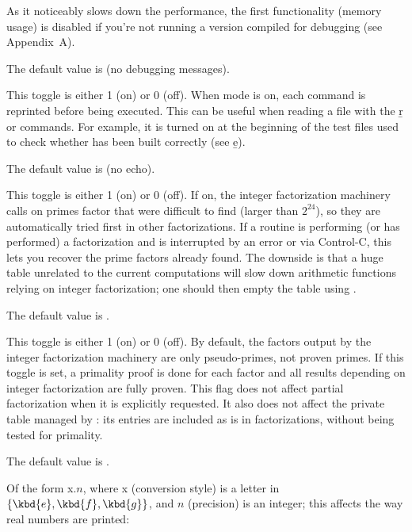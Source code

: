 As it noticeably slows down the performance,
the first functionality (memory usage) is disabled if you're not running a
version compiled for debugging (see Appendix~A).

The default value is  (no debugging messages).

\label{se:def,echo}
This toggle is either 1 (on) or 0 (off). When 
mode is on, each command is reprinted before being executed. This can be
useful when reading a file with the \b{r} or  commands. For
example, it is turned on at the beginning of the test files used to check
whether  has been built correctly (see \b{e}).

The default value is  (no echo).

\label{se:def,factor_add_primes}
This toggle is either 1 (on) or 0 (off). If on,
the integer factorization machinery calls  on primes
factor that were difficult to find (larger than $2^24$), so they are
automatically tried first in other factorizations. If a routine is performing
(or has performed) a factorization and is interrupted by an error or via
Control-C, this lets you recover the prime factors already found. The
downside is that a huge  table unrelated to the current
computations will slow down arithmetic functions relying on integer
factorization; one should then empty the table using .

The default value is .

\label{se:def,factor_proven}
This toggle is either 1 (on) or 0 (off). By
default, the factors output by the integer factorization machinery are
only pseudo-primes, not proven primes. If this toggle is
set, a primality proof is done for each factor and all results depending on
integer factorization are fully proven. This flag does not affect partial
factorization when it is explicitly requested. It also does not affect the
private table managed by : its entries are included as is in
factorizations, without being tested for primality.

The default value is .

\label{se:def,format}
Of the form x$.n$, where x (conversion style)
is a letter in $\{\kbd{e},\kbd{f},\kbd{g}\}$, and $n$ (precision) is an
integer; this affects the way real numbers are printed:

